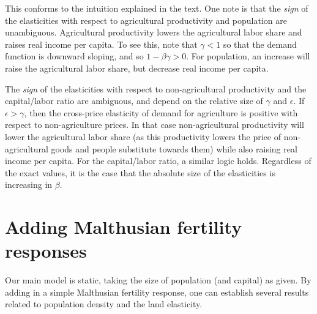 \documentclass[11pt]{article}
\begin{document}
This conforms to the intuition explained in the text. One note is that the \textit{sign} of the elasticities with respect to agricultural productivity and population are unambiguous. Agricultural productivity lowers the agricultural labor share and raises real income per capita. To see this, note that $\gamma<1$ so that the demand function is downward sloping, and so $1-\beta\gamma>0$. For population, an increase will raise the agricultural labor share, but decrease real income per capita.

The \textit{sign} of the elasticities with respect to non-agricultural productivity and the capital/labor ratio are ambiguous, and depend on the relative size of $\gamma$ and $\epsilon$. If $\epsilon>\gamma$, then the cross-price elasticity of demand for agriculture is positive with respect to non-agriculture prices. In that case non-agricultural productivity will lower the agricultural labor share (as this productivity lowers the price of non-agricultural goods and people substitute towards them) while also raising real income per capita. For the capital/labor ratio, a similar logic holds. Regardless of the exact values, it is the case that the absolute size of the elasticities is increasing in $\beta$.

\section{Adding Malthusian fertility responses}
Our main model is static, taking the size of population (and capital) as given. By adding in a simple Malthusian fertility response, one can establish several results related to population density and the land elasticity. 
\end{document}

